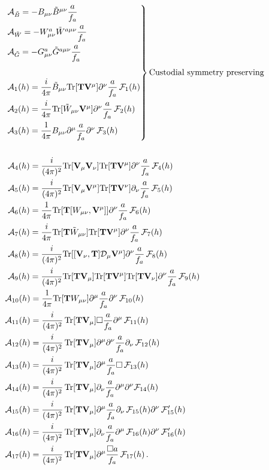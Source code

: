 \documentclass[11pt]{article}
\newcommand{\A}{\mathcal{A}}
\newcommand{\D}{\mathcal{D}}
\newcommand{\F}{\mathcal{F}}
\newcommand{\T}{\mathbf{T}}
\newcommand{\V}{\mathbf{V}}
\newcommand{\BBd}{B_{\mu\nu}}
\newcommand{\WWd}{W_{\mu\nu}}
\newcommand{\tr}{{\rm Tr}}
\newcommand{\de}{\partial}
\renewcommand{\[}{\begin{equation}}
\renewcommand{\]}{\end{equation}}
\begin{document}
\begin{equation}
\begin{aligned}
&\begin{rcases}
\A_{\tilde{B}} =-\BBd\tilde{B}^{\mu\nu}\dfrac{a}{f_a}\\
\A_{\tilde{W}} =-\WWd^a\tilde{W}^{a\mu\nu}\dfrac{a}{f_a}\\
\A_{\tilde{G}} =-G^a_{\mu\nu}\tilde{G}^{a\mu\nu}\dfrac{a}{f_a}\\
\\
\A_1(h) = \dfrac{i}{4\pi} \tilde{B}_{\mu\nu} \tr[\T\V^\mu] \de^\nu \dfrac{a}{f_a} \,\F_1(h)\\
\A_2 (h)= \dfrac{i}{4\pi} \tr[\tilde{W}_{\mu\nu}\V^\mu] \de^\nu \dfrac{a}{f_a} \,\F_2(h)\\
\A_3(h)= \dfrac{1}{4\pi} B_{\mu\nu}\de^\mu \dfrac{a}{f_a}\de^\nu \,\F_3(h) \\
\end{rcases} \textrm{Custodial symmetry preserving} \\
\\
&\,\, \A_4 (h) = \frac{i}{(4\pi)^2} \tr[\V_\mu\V_\nu]\tr[\T\V^\mu]\de^\nu \frac{a}{f_a }\,\F_4(h)\\
&\,\, \A_5 (h) = \frac{i}{(4\pi)^2} \tr[\V_\mu\V^\mu]\tr[\T\V^\nu] \de_\nu \frac{a}{f_a}\, \F_5(h)\\
&\,\, \A_6(h)  = \frac{1}{4\pi} \tr[\T[\WWd,\V^\mu]]\de^\nu \frac{a}{f_a} \,\F_6(h)\\
&\,\, \A_7(h)  = \frac{i}{4\pi}  \tr[\T\tilde{W}_{\mu\nu}]\tr[\T\V^\mu]\de^\nu \frac{a}{f_a} \,\F_7(h)\\
&\,\, \A_8(h)  = \frac{i}{(4\pi)^2} \tr[[\V_\nu,\T]\D_\mu\V^\mu] \de^\nu \frac{a}{f_a} \,\F_8(h)\\
&\,\, \A_9(h)  = \frac{i}{(4\pi)^2} \tr[\T\V_\mu]\tr[\T\V^\mu]\tr[\T\V_\nu]\de^\nu \frac{a}{f_a} \,\F_9(h)\\
& \A_{10}(h) =\frac{1}{4\pi} \tr[\T W_{\mu\nu}]\de^\mu \frac{a}{f_a} \de^\nu \,\F_{10}(h)\\
& \A_{11}(h) = \frac{i}{(4\pi)^2} \,\tr[\T\V_\mu]\square \frac{a}{f_a}\de^\mu\,\F_{11}(h)\\
& \A_{12}(h) = \frac{i}{(4\pi)^2} \,\tr[\T\V_\mu]\de^\mu\de^\nu \frac{a}{f_a}\de_\nu \,\F_{12}(h)\\
& \A_{13}(h) = \frac{i}{(4\pi)^2} \,\tr[\T\V_\mu]\de^\mu \frac{a}{f_a} \square\,\F_{13}(h)\\
& \A_{14}(h) = \frac{i}{(4\pi)^2} \,\tr[\T\V_\mu]\de_\nu \frac{a}{f_a}\de^\mu \de^\nu \F_{14}(h)\\
& \A_{15}(h) = \frac{i}{(4\pi)^2} \,\tr[\T\V_\mu]\de^\mu \frac{a}{f_a} \de_\nu \,\F_{15}(h)\de^\nu\, \F_{15}^\prime(h)\\
& \A_{16}(h) = \frac{i}{(4\pi)^2} \,\tr[\T\V_\mu]\de_\nu \frac{a}{f_a} \de^\mu \,\F_{16}(h)\de^\nu \,\F_{16}^\prime (h) \\
& \A_{17} (h) = \frac{i}{(4\pi)^2} \,\tr[\T\V_\mu]\de^\mu\frac{\square a}{f_a}\,\F_{17}(h)\,.
\end{aligned}
\label{bosonic_basis}
\end{equation}
\end{document}
